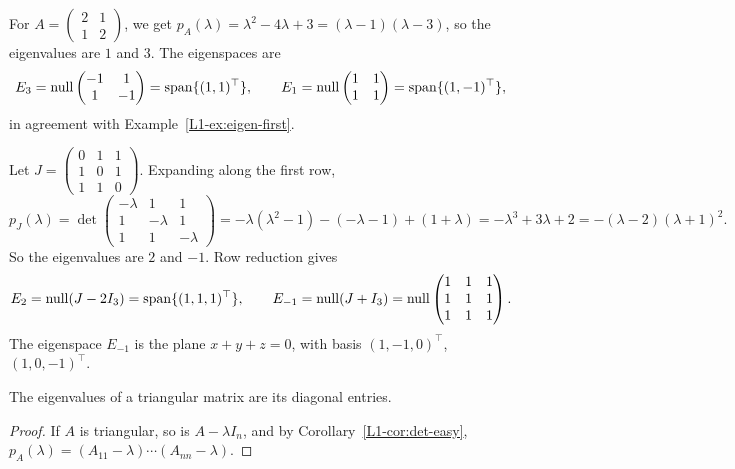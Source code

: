 \begin{example}\label{L1-ex:eigen-2x2}
    For $A = \begin{pmatrix} 2 & 1 \\ 1 & 2 \end{pmatrix}$, we get $p_A(\lambda) = \lambda^2 - 4\lambda + 3 = (\lambda - 1)(\lambda - 3)$, so the eigenvalues are $1$ and $3$. The eigenspaces are
    \[E_3 = \operatorname{null} \begin{pmatrix} -1 & 1 \\ 1 & -1 \end{pmatrix} = \operatorname{span}\{(1, 1)^\top\}, \qquad E_1 = \operatorname{null} \begin{pmatrix} 1 & 1 \\ 1 & 1 \end{pmatrix} = \operatorname{span}\{(1, -1)^\top\},\]
    in agreement with Example~\ref{L1-ex:eigen-first}.
\end{example}

\begin{example}\label{L1-ex:eigen-3x3}
    Let $J = \begin{pmatrix} 0 & 1 & 1 \\ 1 & 0 & 1 \\ 1 & 1 & 0 \end{pmatrix}$. Expanding along the first row,
    \[p_J(\lambda) = \det \begin{pmatrix} -\lambda & 1 & 1 \\ 1 & -\lambda & 1 \\ 1 & 1 & -\lambda \end{pmatrix} = -\lambda(\lambda^2 - 1) - (-\lambda - 1) + (1 + \lambda) = -\lambda^3 + 3\lambda + 2 = -(\lambda - 2)(\lambda + 1)^2.\]
    So the eigenvalues are $2$ and $-1$. Row reduction gives
    \[E_2 = \operatorname{null}(J - 2I_3) = \operatorname{span}\{(1, 1, 1)^\top\}, \qquad E_{-1} = \operatorname{null}(J + I_3) = \operatorname{null} \begin{pmatrix} 1 & 1 & 1 \\ 1 & 1 & 1 \\ 1 & 1 & 1 \end{pmatrix}.\]
    The eigenspace $E_{-1}$ is the plane $x + y + z = 0$, with basis $(1, -1, 0)^\top$, $(1, 0, -1)^\top$.
\end{example}

\begin{proposition}\label{L1-prop:eigen-triangular}
    The eigenvalues of a triangular matrix are its diagonal entries.
\end{proposition}

\begin{proof}
    If $A$ is triangular, so is $A - \lambda I_n$, and by Corollary~\ref{L1-cor:det-easy}, $p_A(\lambda) = (A_{11} - \lambda) \cdots (A_{nn} - \lambda)$.
\end{proof}

